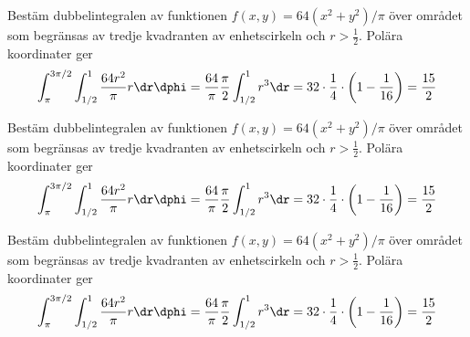 Bestäm dubbelintegralen av funktionen $f(x, y) = 64(x^2 + y^2)/\pi$ över området
som begränsas av tredje kvadranten av enhets\-cirkeln och $r > \tfrac12$.
Polära koordinater ger
\begin{align*}
  \int_{\pi}^{3\pi/2}\int_{1/2}^1 \frac{64r^2}{\pi} r\dr\dphi
  = \frac{64}{\pi}\frac{\pi}{2} \int_{1/2}^1 r^3\dr
  = 32 \cdot \frac{1}{4} \cdot \left(1 - \frac1{16}\right) = \frac{15}2
\end{align*}
%

Bestäm dubbelintegralen av funktionen $f(x, y) = 64(x^2 + y^2)/\pi$ över området
som begränsas av tredje kvadranten av enhets\-cirkeln och $r > \tfrac12$.
Polära koordinater ger
\begin{align*}
  \int_{\pi}^{3\pi/2}\int_{1/2}^1 \frac{64r^2}{\pi} r\dr\dphi
  = \frac{64}{\pi}\frac{\pi}{2} \int_{1/2}^1 r^3\dr
  = 32 \cdot \frac{1}{4} \cdot \left(1 - \frac1{16}\right) = \frac{15}2
\end{align*}
%

Bestäm dubbelintegralen av funktionen $f(x, y) = 64(x^2 + y^2)/\pi$ över området
som begränsas av tredje kvadranten av enhets\-cirkeln och $r > \tfrac12$.
Polära koordinater ger
\begin{align*}
  \int_{\pi}^{3\pi/2}\int_{1/2}^1 \frac{64r^2}{\pi} r\dr\dphi
  = \frac{64}{\pi}\frac{\pi}{2} \int_{1/2}^1 r^3\dr
  = 32 \cdot \frac{1}{4} \cdot \left(1 - \frac1{16}\right) = \frac{15}2
\end{align*}
%
